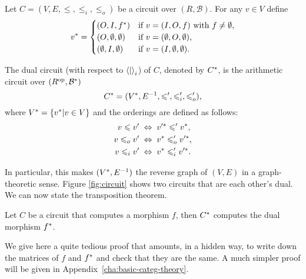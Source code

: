 \begin{definition}
  \label{def:dual}
  Let $C=(V,E,\le,\le_i,\le_o)$ be a circuit over
  $(R,\mathcal{B})$. For any $v\in V$ define
  \begin{equation}
    \label{eq:244}
    v^\ast =
    \begin{cases}
    (O,I,f^\ast)          &\text{if $v=(I,O,f)$ with $f\ne\emptyset$,}\\
    (O,\emptyset,\emptyset) &\text{if $v=(\emptyset,O,\emptyset)$,}\\
    (\emptyset,I,\emptyset) &\text{if $v=(I,\emptyset,\emptyset)$.}
    \end{cases}
  \end{equation}

  The dual circuit (with respect to $\left\langle  \middle|  \right\rangle_i$) of $C$, denoted
  by $C^\ast$, is the arithmetic circuit over
  $(R^{\mathrm{op}},\mathcal{B}^\ast)$
  \[C^\ast = (V^\ast, E^{-1},\leqslant',\leqslant_i',\leqslant_o')\text{,}\]
  where $V^\ast=\{v^\ast|v\in V\}$ and the orderings are defined
  as follows:
  \begin{align}
    v \leqslant v' \;&\Leftrightarrow\; v'^\ast \leqslant' v^\ast\text{,}\\
    v \leqslant_o v' \;&\Leftrightarrow\; v^\ast \leqslant_o' v'^\ast\text{,}\\
    v \leqslant_i v' \;&\Leftrightarrow\; v^\ast \leqslant_i' v'^\ast\text{.}
  \end{align}
\end{definition}

In particular, this makes $(V^\ast,E^{-1})$ the reverse graph of
$(V,E)$ in a graph-theoretic sense. Figure \ref{fig:circuit} shows two
circuits that are each other's dual. We can now state the
transposition theorem.

\begin{theorem}
  \label{th:tellegen}
  Let $C$ be a circuit that computes a morphism $f$, then $C^\ast$
  computes the dual morphism $f^\ast$.
\end{theorem}

We give here a quite tedious proof that amounts, in a hidden way, to
write down the matrices of $f$ and $f^\ast$ and check that they are
the same. A much simpler proof will be given in
Appendix~\ref{cha:basic-categ-theory}.


